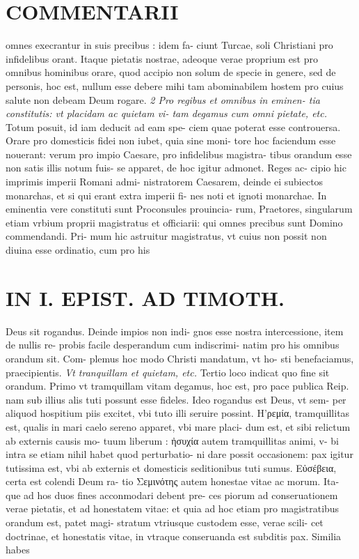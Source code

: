 \documentclass{article}
\begin{document}
\begin{pages}
\section*{COMMENTARII }\pstart omnes execrantur in suis precibus : idem fa- ciunt Turcae, soli Christiani pro infidelibus orant. Itaque pietatis nostrae, adeoque verae proprium est pro omnibus hominibus orare, quod accipio non solum de specie in genere, sed de personis, hoc est, nullum esse debere mihi tam abominabilem hostem pro cuius salute non debeam Deum rogare.  \pend
\textit{2 Pro regibus et omnibus in eminen- tia constitutis: vt placidam ac quietam vi- tam degamus cum omni pietate, etc. }\pstart Totum posuit, id iam deducit ad eam spe- ciem quae poterat esse controuersa. Orare pro domesticis fidei non iubet, quia sine moni- tore hoc faciendum esse nouerant: verum pro impio Caesare, pro infidelibus magistra- tibus orandum esse non satis illis notum fuis- se apparet, de hoc igitur admonet. Reges ac- cipio hic imprimis imperii Romani admi- nistratorem Caesarem, deinde ei subiectos monarchas, et si qui erant extra imperii fi- nes noti et ignoti monarchae. In eminentia vere constituti sunt Proconsules prouincia- rum, Praetores, singularum etiam vrbium proprii magistratus et officiarii: qui omnes precibus sunt Domino commendandi. Pri- mum hic astruitur magistratus, vt cuius non possit non diuina esse ordinatio, cum pro his  \pend
\section*{IN I. EPIST. AD TIMOTH. }
\marginpar{[ p.47 ]}\pstart Deus sit rogandus. Deinde impios non indi- gnos esse nostra intercessione, item de nullis re- probis facile desperandum cum indiscrimi- natim pro his omnibus orandum sit. Com- plemus hoc modo Christi mandatum, vt ho- sti benefaciamus, praecipientis.  \pend
\textit{Vt tranquillam et quietam, etc. }\pstart Tertio loco indicat quo fine sit orandum. Primo vt tramquillam vitam degamus, hoc est, pro pace publica Reip. nam sub illius alis tuti possunt esse fideles. Ideo rogandus est Deus, vt sem- per aliquod hospitium piis excitet, vbi tuto illi seruire possint. H'ρεμία, tramquillitas est, qualis in mari caelo sereno apparet, vbi mare placi- dum est, et sibi relictum ab externis causis mo- tuum liberum : ἠσυχία autem tramquillitas animi, v- bi intra se etiam nihil habet quod perturbatio- ni dare possit occasionem: pax igitur tutissima est, vbi ab externis et domesticis seditionibus tuti sumus. Εὐσέβεια, certa est colendi Deum ra- tio Σεμινότης autem honestae vitae ac morum. Ita- que ad hos duos fines acconmodari debent pre- ces piorum ad conseruationem verae pietatis, et ad honestatem vitae: et quia ad hoc etiam pro magistratibus orandum est, patet magi- stratum vtriusque custodem esse, verae scili- cet doctrinae, et honestatis vitae, in vtraque conseruanda est subditis pax. Similia habes  \pend

\end{pages}
\end{document}
